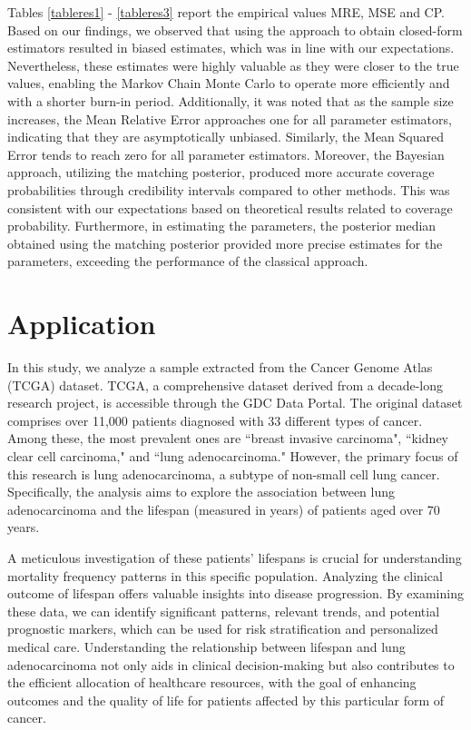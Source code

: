 \documentclass[]{interact}
\theoremstyle{plain}%
\theoremstyle{definition}
\theoremstyle{remark}
\begin{document}
{\color{black}
Tables \ref{tableres1} - \ref{tableres3} report the empirical values MRE, MSE and CP. Based on our findings, we observed that using the approach to obtain closed-form estimators resulted in biased estimates, which was in line with our expectations. Nevertheless, these estimates were highly valuable as they were closer to the true values, enabling the Markov Chain Monte Carlo to operate more efficiently and with a shorter burn-in period. Additionally, it was noted that as the sample size increases, the Mean Relative Error approaches one for all parameter estimators, indicating that they are asymptotically unbiased. Similarly, the Mean Squared Error tends to reach zero for all parameter estimators.
}
Moreover, the Bayesian approach, utilizing the matching posterior, produced more accurate coverage probabilities through credibility intervals compared to other methods. This was consistent with our expectations based on theoretical results related to coverage probability. Furthermore, in estimating the parameters, the posterior median obtained using the matching posterior provided more precise estimates for the parameters, exceeding the performance of the classical approach.

\section{Application}

In this study, we analyze a sample extracted from the Cancer Genome Atlas (TCGA) dataset. TCGA, a comprehensive dataset derived from a decade-long research project, is accessible through the GDC Data Portal. The original dataset comprises over 11,000 patients diagnosed with 33 different types of cancer. Among these, the most prevalent ones are  ``breast invasive carcinoma", ``kidney clear cell carcinoma," and ``lung adenocarcinoma." However, the primary focus of this research is lung adenocarcinoma, a subtype of non-small cell lung cancer. Specifically, the analysis aims to explore the association between lung adenocarcinoma and the lifespan (measured in years) of patients aged over 70 years.

A meticulous investigation of these patients' lifespans is crucial for understanding mortality frequency patterns in this specific population. Analyzing the clinical outcome of lifespan offers valuable insights into disease progression. By examining these data, we can identify significant patterns, relevant trends, and potential prognostic markers, which can be used for risk stratification and personalized medical care. Understanding the relationship between lifespan and lung adenocarcinoma not only aids in clinical decision-making but also contributes to the efficient allocation of healthcare resources, with the goal of enhancing outcomes and the quality of life for patients affected by this particular form of cancer.
\end{document}
